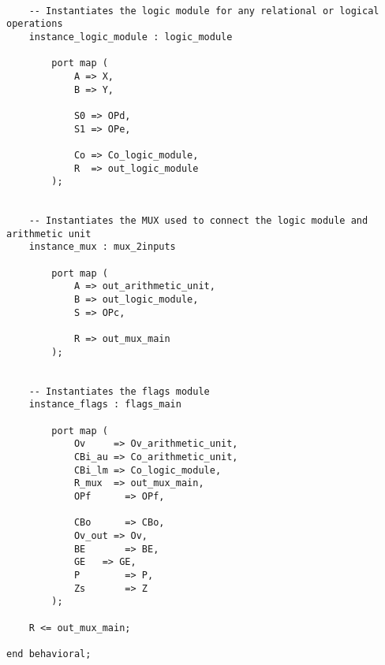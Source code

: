 \begin{lstlisting}
			
	-- Instantiates the logic module for any relational or logical operations
	instance_logic_module : logic_module
	
		port map (
			A => X,
			B => Y,
			
			S0 => OPd,
			S1 => OPe,
			
			Co => Co_logic_module,
			R  => out_logic_module
		);
		
	
	-- Instantiates the MUX used to connect the logic module and arithmetic unit
	instance_mux : mux_2inputs 
	
		port map (
			A => out_arithmetic_unit,
			B => out_logic_module,
			S => OPc,
			
			R => out_mux_main
		);
		
	
	-- Instantiates the flags module
	instance_flags : flags_main
		
		port map (
			Ov     => Ov_arithmetic_unit,
			CBi_au => Co_arithmetic_unit,
			CBi_lm => Co_logic_module,
			R_mux  => out_mux_main,
			OPf 	 => OPf,
			
			CBo 	 => CBo,
			Ov_out => Ov,
			BE		 => BE,
			GE 	 => GE,
			P		 => P,
			Zs		 => Z
		);
		
	R <= out_mux_main;
			
end behavioral;
	




	
\end{lstlisting}
\clearpage